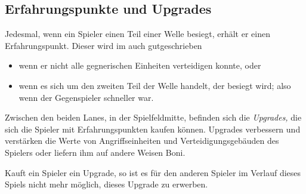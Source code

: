 \subsection{Erfahrungspunkte und Upgrades}\label{sec:exp-upgrades}

Jedesmal, wenn ein Spieler einen Teil einer Welle besiegt, erhält er einen
Erfahrungspunkt. Dieser wird im auch gutgeschrieben
\begin{itemize}[noitemsep]
    \item wenn er nicht alle gegnerischen Einheiten verteidigen konnte,
    oder
    \item wenn es sich um den zweiten Teil der Welle handelt, der
      besiegt wird; also wenn der Gegenspieler schneller war.
\end{itemize}

\noindent
Zwischen den beiden Lanes, in der Spielfeldmitte, befinden sich die
\emph{Upgrades,} die sich die Spieler mit Erfahrungspunkten kaufen können.
Upgrades verbessern und verstärken die Werte von Angriffseinheiten und
Verteidigungsgebäuden des Spielers oder liefern ihm auf andere Weisen Boni.

Kauft ein Spieler ein Upgrade, so ist es für den anderen Spieler im Verlauf
dieses Spiels nicht mehr möglich, dieses Upgrade zu erwerben.
